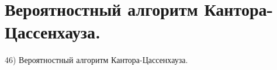 \section{
 Вероятностный алгоритм Кантора-Цассенхауза.
}

46) Вероятностный алгоритм Кантора-Цассенхауза.
